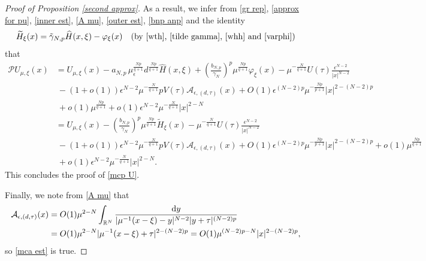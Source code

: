 \documentclass[reqno]{amsart}
\theoremstyle{remark}
\newcommand{\ep}{\epsilon}
\newcommand{\ga}{\gamma}
\newcommand{\R}{\mathbb{R}}
\newcommand{\mca}{\mathcal{A}}
\newcommand{\mcp}{\mathcal{P}}
\newcommand{\whh}{\widehat{H}}
\newcommand{\wth}{\widetilde{H}}
\newcommand{\dy}{\textup{d}y}
\newcommand{\mx}{{\mu,\xi}}
\renewcommand{\(}{\left(}
\renewcommand{\)}{\right)}
\numberwithin{equation}{section}
\begin{document}
\begin{proof}[Proof of Proposition \ref{second approx}]
As a result, we infer from \eqref{gr rep}, \eqref{approx for pu}, \eqref{inner est}, \eqref{A mu}, \eqref{outer est}, \eqref{bnp anp} and the identity
\[\wth_\xi(x) = \tilde{\ga}_{N,p}\whh(x,\xi)-\varphi_\xi(x) \quad \textup{(by \eqref{wth}, \eqref{tilde gamma}, \eqref{whh} and \eqref{varphi})}\]
that
\begin{align*}
\mcp U_\mx(x) &= U_\mx(x)-a_{N,p}\, \mu_\ep^{\frac{Np}{q+1}}d^{\frac{Np}{q+1}}\whh(x,\xi) + \(\frac{b_{N,p}}{\ga_N}\)^p\mu^{\frac{Np}{q+1}}\varphi_\xi(x) - \mu^{-\frac{N}{q+1}}U(\tau)\frac{\ep^{N-2}}{|x|^{N-2}} \\
&\ -(1+o(1))\ep^{N-2}\mu^{-\frac{N}{q+1}}pV(\tau) \mca_{\ep,(d,\tau)}(x) + O(1)\ep^{(N-2)p}\mu^{-\frac{Np}{p+1}} |x|^{2-(N-2)p}\\
&\ + o(1)\mu^{\frac{Np}{q+1}} + o(1)\ep^{N-2}\mu^{-\frac{N}{q+1}}|x|^{2-N}\\
&=U_\mx(x)- \(\frac{b_{N,p}}{\ga_N}\)^p\mu^{\frac{Np}{q+1}}\wth_\xi(x) -\mu^{-\frac{N}{q+1}}U(\tau)\frac{\ep^{N-2}}{|x|^{N-2}} \\
&\ - (1+o(1))\ep^{N-2}\mu^{-\frac{N}{q+1}}pV(\tau) \mca_{\ep,(d,\tau)}(x) + O(1)\ep^{(N-2)p}\mu^{-\frac{Np}{p+1}}|x|^{2-(N-2)p} + o(1)\mu^{\frac{Np}{q+1}}\\
&\ + o(1)\ep^{N-2}\mu^{-\frac{N}{q+1}}|x|^{2-N}.
\end{align*}
This concludes the proof of \eqref{mcp U}.

Finally, we note from \eqref{A mu} that
\begin{align*}
\mca_{\ep,(d,\tau)}(x) &= O(1)\mu^{2-N}\int_{\R^N} \frac{\dy}{|\mu^{-1}(x-\xi)-y|^{N-2}|y+\tau|^{(N-2)p}} \\
&= O(1)\mu^{2-N}|\mu^{-1}(x-\xi)+\tau|^{2-(N-2)p}=O(1)\mu^{(N-2)p-N}|x|^{2-(N-2)p},
\end{align*}
so \eqref{mca est} is true.
\end{proof}
\end{document}
